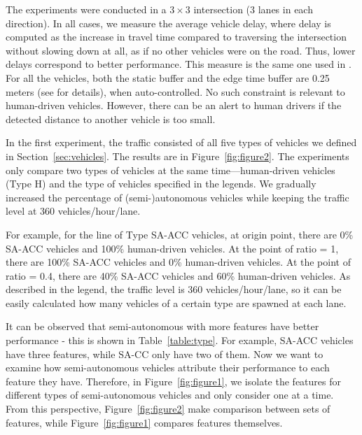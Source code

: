 The experiments were conducted in a $3 \times 3$ intersection (3 lanes
in each direction).  In all cases, we measure the average vehicle delay,
where delay is computed as the increase in travel time compared to
traversing the intersection without slowing down at all, as if no
other vehicles were on the road. Thus, lower delays correspond to
better performance.  This measure is the same one used in
\cite{bib:Dresner08Multiagent}. For all the vehicles, both the static
buffer and the edge time buffer are 0.25 meters (see
\cite{bib:Dresner08Multiagent} for details), when auto-controlled.  No
such constraint is relevant to human-driven vehicles. However, there
can be an alert to human drivers if the detected distance to another
vehicle is too small.

In the first experiment, the traffic consisted of all five types of
vehicles we defined in Section~\ref{sec:vehicles}. The results are in
Figure~\ref{fig:figure2}. The experiments only compare two types of
vehicles at the same time---human-driven vehicles (Type H) and the
type of vehicles specified in the legends. We gradually increased the
percentage of (semi-)autonomous vehicles while keeping the traffic
level at 360 vehicles/hour/lane.

For example, for the line of Type SA-ACC vehicles, at origin point,
there are 0\% SA-ACC vehicles and 100\% human-driven vehicles. At the
point of ratio = 1, there are 100\% SA-ACC vehicles and 0\%
human-driven vehicles. At the point of ratio = 0.4, there are 40\%
SA-ACC vehicles and 60\% human-driven vehicles. As described in the
legend, the traffic level is 360 vehicles/hour/lane, so it can be
easily calculated how many vehicles of a certain type are spawned at
each lane.

It can be observed that semi-autonomous with more features have better
performance - this is shown in Table~\ref{table:type}. For example,
SA-ACC vehicles have three features, while SA-CC only have two of
them. Now we want to examine how semi-autonomous vehicles attribute
their performance to each feature they have. Therefore, in
Figure~\ref{fig:figure1}, we isolate the features for different types
of semi-autonomous vehicles and only consider one at a time. From this
perspective, Figure~\ref{fig:figure2} make comparison between sets of
features, while Figure~\ref{fig:figure1} compares features themselves.


